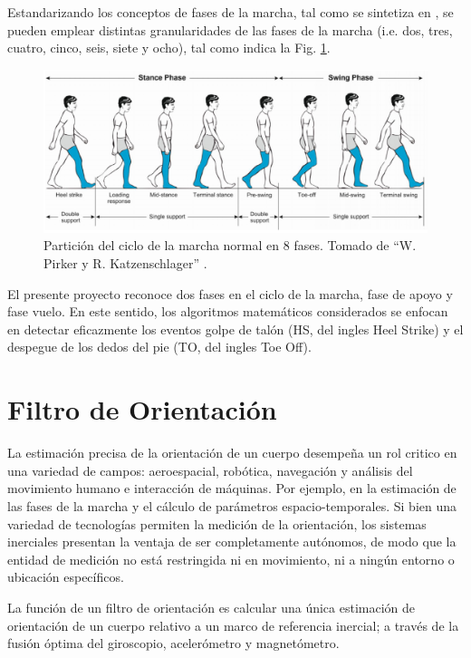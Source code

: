Estandarizando los conceptos de fases de la marcha, tal como se sintetiza en \cite{Taborri2016}, se pueden emplear distintas granularidades de las fases de la marcha (i.e. dos, tres, cuatro, cinco, seis, siete y ocho), tal como indica la Fig. \ref{FIG: ciclo}.

\begin{figure}[h!]
\centering
\includegraphics[clip,width=1.05 \columnwidth]{TESIS/imagenes/img/gaitcycle.png}
\caption{Partición del ciclo de la marcha normal en 8 fases. Tomado de ``W. Pirker y R. Katzenschlager'' \cite{Pirker2016}.}
\label{FIG: ciclo}
\end{figure}

El presente proyecto reconoce dos fases en el ciclo de la marcha, fase de apoyo y fase vuelo. En este sentido, los algoritmos matemáticos considerados se enfocan en detectar eficazmente los eventos golpe de talón (HS, del ingles Heel Strike) y el despegue de los dedos del pie (TO, del ingles Toe Off).

\section{Filtro de Orientación}\label{section:filter_orientation}

La estimación precisa de la orientación de un cuerpo desempeña un rol critico en una variedad de campos: aeroespacial, robótica, navegación y análisis del movimiento humano e interacción de máquinas. Por ejemplo, en la estimación de las fases de la marcha y el cálculo de parámetros espacio-temporales. Si bien una variedad de tecnologías permiten la medición de la orientación, los sistemas inerciales presentan la ventaja de ser completamente autónomos, de modo que la entidad de medición no está restringida ni en movimiento, ni a ningún entorno o ubicación específicos.

La función de un filtro de orientación es calcular una única estimación de orientación de un cuerpo relativo a un marco de referencia inercial; a través de la fusión óptima del giroscopio, acelerómetro y magnetómetro. 

